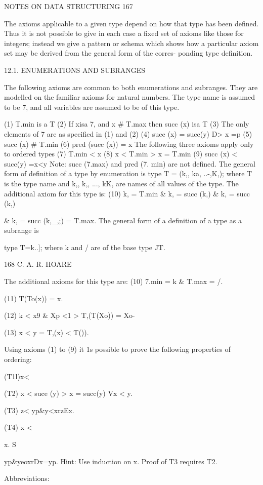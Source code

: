 NOTES ON DATA STRUCTURING 167

The axioms applicable to a given type depend on how that type has been defined. Thus it is not possible to give in each case a fixed set of axioms like those for integers; instead we give a pattern or schema which shows how a particular axiom set may be derived from the general form of the corres- ponding type definition.

12.1. ENUMERATIONS AND SUBRANGES

The following axioms are common to both enumerations and subranges. They are modelled on the familiar axioms for natural numbers. The type name is assumed to be 7, and all variables are assumed to be of this type.

(1) T.min is a T (2) If xisa 7, and x # T.max then succ (x) isa T (3) The only elements of 7 are as specified in (1) and (2) (4) succ (x) = succ(y) D> x =p (5) succ (x) # T.min (6) pred (succ (x)) = x The following three axioms apply only to ordered types (7) T.min < x (8) x < T.min > x = T.min (9) succ (x) < succ(y) =x<y Note: succ (7.max) and pred (7. min) are not defined. The general form of definition of a type by enumeration is type T = (k,, ka, ..-,K,); where T is the type name and k,, k,, ..., kK, are names of all values of the type. The additional axiom for this type is: (10) k, = T.min & k, = succ (k,) & k, = succ (k,)

& k, = succ (k,_,;) = T.max. The general form of a definition of a type as a subrange is

type T=k..]; where k and / are of the base type JT.

168 C. A. R. HOARE

The additional axioms for this type are: (10) 7.min = k & T.max = /.

(11) T(To(x)) = x.

(12) k < x9 & Xp <1 > T,(T(Xo)) = Xo-

(13) x < y = T,(x) < T()).

Using axioms (1) to (9) it 1s possible to prove the following properties of ordering:

(T1l)x<

(T2) x < suce (y) > x = succ(y) Vx < y.

(T3) z< yp&y<xrzEx.

(T4) x <

x. S

yp&yeoxrDx=yp. Hint: Use induction on x. Proof of T3 requires T2.

Abbreviations:

